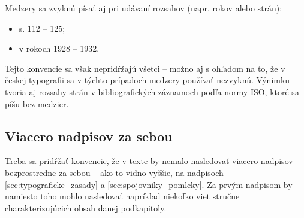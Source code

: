 Medzery sa zvyknú písať aj pri udávaní rozsahov (napr. rokov alebo strán):
\begin{itemize}
\item s. 112 -- 125;
\item v rokoch 1928 -- 1932.
\end{itemize}
Tejto konvencie sa však nepridŕžajú všetci -- možno aj s ohľadom na to, že v českej typografii sa v týchto prípadoch medzery používať nezvyknú. Výnimku tvoria aj rozsahy strán v bibliografických záznamoch podľa normy ISO, ktoré sa píšu bez medzier.

\subsection{Viacero nadpisov za sebou}

Treba sa pridŕžať konvencie, že v texte by nemalo nasledovať viacero nadpisov bezprostredne za sebou -- ako to vidno vyššie, na nadpisoch \ref{sec:typograficke_zasady} a \ref{sec:spojovniky_pomlcky}. Za prvým nadpisom by namiesto toho mohlo nasledovať napríklad niekoľko viet stručne charakterizujúcich obsah danej podkapitoly.